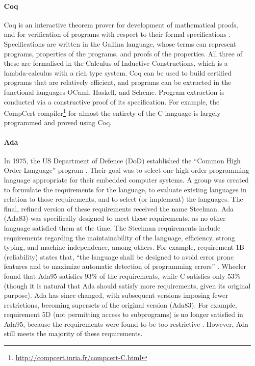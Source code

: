 \paragraph{Coq}
Coq is an interactive theorem prover for development of mathematical proofs, and for verification of programs with respect to their formal specifications \cite{coqRM}.
Specifications are written in the Gallina language, whose terms can represent programs, properties of the programs, and proofs of the properties.
All three of these are formalised in the Calculus of Inductive Constructions, which is a lambda-calculus with a rich type system.
Coq can be used to build certified programs that are relatively efficient, and programs can be extracted in the functional languages OCaml, Haskell, and Scheme.
Program extraction is conducted via a constructive proof of its specification.
For example, the CompCert compiler\footnote{\url{http://compcert.inria.fr/compcert-C.html}} for almost the entirety of the C language is largely programmed and proved using Coq.

\paragraph{Ada}
In 1975, the US Department of Defence (DoD) established the ``Common High Order Language'' program \cite{wheeler1997}.
Their goal was to select one high order programming language appropriate for their embedded computer systems.
A group was created to formulate the requirements for the language, to evaluate existing languages in relation to those requirements, and to select (or implement) the languages.
The final, refined version of these requirements received the name Steelman.
Ada (Ada83) was specifically designed to meet these requirements, as no other language satisfied them at the time.
The Steelman requirements include requirements regarding the maintainability of the language, efficiency, strong typing, and machine independence, among others.
For example, requirement 1B (reliability) states that, ``the language shall be designed to avoid error prone features and to maximize automatic detection of programming errors'' \cite{wheeler1997}.
Wheeler found that Ada95 satisfies 93\% of the requirements, while C satisfies only 53\% (though it is natural that Ada should satisfy more requirements, given its original purpose).
Ada has since changed, with subsequent versions imposing fewer restrictions, becoming supersets of the original version (Ada83).
For example, requirement 5D (not permitting access to subprograms) is no longer satisfied in Ada95, because the requirements were found to be too restrictive \cite{wheeler1997}.
However, Ada still meets the majority of these requirements.

